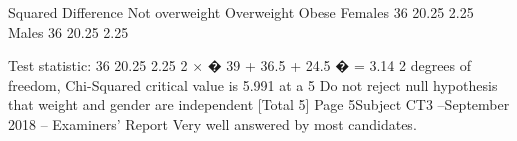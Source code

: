 Squared Difference
Not overweight Overweight Obese
Females
36
20.25
2.25
Males
36
20.25
2.25

Test statistic:
36
20.25
2.25
2 × � 39 + 36.5 + 24.5 � = 3.14 
2 degrees of freedom, Chi-Squared critical value is 5.991 at a 5%
Do not reject null hypothesis that weight and gender are independent 
[Total 5]
Page 5Subject CT3  –September 2018 – Examiners’ Report
Very well answered by most candidates.
